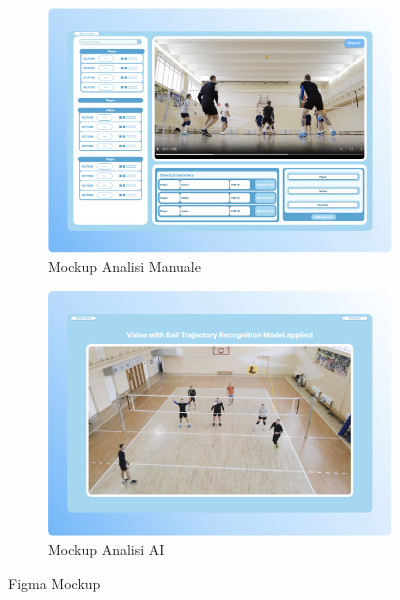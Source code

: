 \begin{figure}[htb]
    \centering 
    \begin{subfigure}{0.48\textwidth}
        \includegraphics[width=\linewidth]{img/figma_manual.png}
        \caption{Mockup Analisi Manuale}
        \label{fig:mokup_manual}
    \end{subfigure}\hspace{0.04\textwidth}%
    \begin{subfigure}{0.48\textwidth}
        \includegraphics[width=\linewidth]{img/figma_ai.png}
        \caption{Mockup Analisi AI}
        \label{fig:mokup_ai}
    \end{subfigure}
    \caption{Figma Mockup}
    \label{fig:bot_competitor}
\end{figure}

